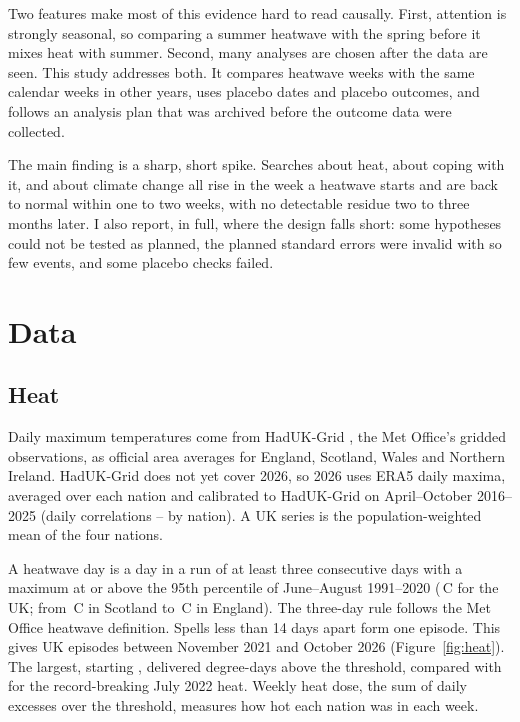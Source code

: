 \documentclass[11pt,a4paper]{article}
\begin{document}
Two features make most of this evidence hard to read causally. First, attention is strongly seasonal, so comparing a summer heatwave with the spring before it mixes heat with summer. Second, many analyses are chosen after the data are seen. This study addresses both. It compares heatwave weeks with the same calendar weeks in other years, uses placebo dates and placebo outcomes, and follows an analysis plan that was archived before the outcome data were collected.

The main finding is a sharp, short spike. Searches about heat, about coping with it, and about climate change all rise in the week a heatwave starts and are back to normal within one to two weeks, with no detectable residue two to three months later. I also report, in full, where the design falls short: some hypotheses could not be tested as planned, the planned standard errors were invalid with so few events, and some placebo checks failed.

\section{Data}

\subsection{Heat}

Daily maximum temperatures come from HadUK-Grid \citep{hollis2019}, the Met Office's gridded observations, as official area averages for England, Scotland, Wales and Northern Ireland. HadUK-Grid does not yet cover 2026, so 2026 uses ERA5 \citep{hersbach2020} daily maxima, averaged over each nation and calibrated to HadUK-Grid on April--October 2016--2025 (daily correlations \CalRMin--\CalRMax{} by nation). A UK series is the population-weighted mean of the four nations.

A heatwave day is a day in a run of at least three consecutive days with a maximum at or above the 95th percentile of June--August 1991--2020 (\ThrUK\,\textdegree{}C for the UK; from \ThrScotland\,\textdegree{}C in Scotland to \ThrEngland\,\textdegree{}C in England). The three-day rule follows the Met Office heatwave definition. Spells less than 14 days apart form one episode. This gives \NEpisodes{} UK episodes between November 2021 and October 2026 (Figure~\ref{fig:heat}). The largest, starting \MaxDoseEpisode, delivered \MaxDose{} degree-days above the threshold, compared with \DoseJulyTwentyTwo{} for the record-breaking July 2022 heat. Weekly heat dose, the sum of daily excesses over the threshold, measures how hot each nation was in each week.
\end{document}
